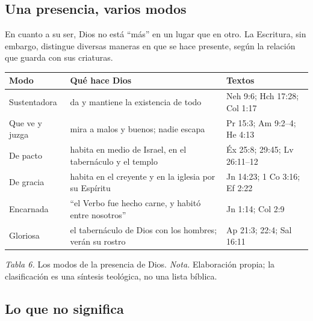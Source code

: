 \documentclass[11pt,letterpaper]{article}
\begin{document}
\subsection{Una presencia, varios modos}

En cuanto a su ser, Dios no está ``más'' en un lugar que en otro. La Escritura, sin embargo, distingue diversas maneras en que se hace presente, según la relación que guarda con sus criaturas.

\begin{center}\small\renewcommand{\arraystretch}{1.2}
\begin{tabular}{@{}L{3.2cm}L{6.0cm}L{4.8cm}@{}}
\toprule
\textbf{Modo} & \textbf{Qué hace Dios} & \textbf{Textos} \\ \midrule
Sustentadora & da y mantiene la existencia de todo & Neh 9:6; Hch 17:28; Col 1:17 \\
Que ve y juzga & mira a malos y buenos; nadie escapa & Pr 15:3; Am 9:2--4; He 4:13 \\
De pacto & habita en medio de Israel, en el tabernáculo y el templo & Éx 25:8; 29:45; Lv 26:11--12 \\
De gracia & habita en el creyente y en la iglesia por su Espíritu & Jn 14:23; 1 Co 3:16; Ef 2:22 \\
Encarnada & ``el Verbo fue hecho carne, y habitó entre nosotros'' & Jn 1:14; Col 2:9 \\
Gloriosa & el tabernáculo de Dios con los hombres; verán su rostro & Ap 21:3; 22:4; Sal 16:11 \\
\bottomrule
\end{tabular}\par
{\footnotesize\color{gris}\textit{Tabla 6.} Los modos de la presencia de Dios. \textit{Nota.} Elaboración propia; la clasificación es una síntesis teológica, no una lista bíblica.}
\end{center}

\subsection{Lo que no significa}
\end{document}
